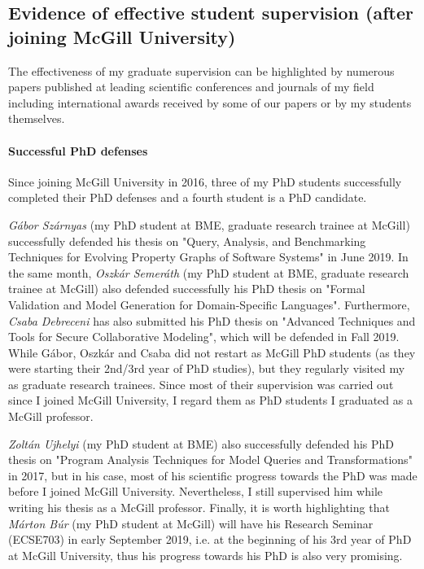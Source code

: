 \documentclass[a4paper,11pt]{report}
\begin{document}

\subsection{Evidence of effective student supervision (after joining McGill University)}

The effectiveness of my graduate supervision can be highlighted by numerous papers published at leading scientific 
conferences and journals of my field including international awards received by some of our papers or by my students 
themselves. 

\paragraph{Successful PhD defenses}
Since joining McGill University in 2016, three of my PhD students successfully completed their PhD defenses and a fourth student is a PhD candidate. 

\emph{Gábor Szárnyas} (my PhD student at BME, graduate research trainee at McGill) successfully defended his thesis on "Query, Analysis, and Benchmarking Techniques for Evolving Property Graphs of Software Systems" in June 2019. In the same month, \emph{Oszkár Semeráth} (my PhD student at BME, graduate research trainee at McGill) also defended successfully his PhD thesis on "Formal Validation and Model Generation for Domain-Specific Languages". Furthermore, \emph{Csaba Debreceni} has also submitted his PhD thesis on "Advanced Techniques and Tools for Secure Collaborative Modeling", which will be defended in Fall 2019. 
While Gábor, Oszkár and Csaba did not restart as McGill PhD students (as they were starting their 2nd/3rd year of PhD studies), but they regularly visited my as graduate research trainees. Since most of their supervision was carried out since I joined McGill University, I regard them as PhD students I graduated as a McGill professor. 

\emph{Zoltán Ujhelyi} (my PhD student at BME) also successfully defended his PhD thesis on "Program Analysis Techniques for Model Queries and Transformations" in 2017, but in his case, most of his scientific progress towards the PhD was made before I joined McGill University. Nevertheless, I still supervised him while writing his thesis as a McGill professor.  Finally, it is worth highlighting that \emph{Márton Búr} (my PhD student at McGill) will have his Research Seminar (ECSE703) in early September 2019, i.e. at the beginning of his 3rd year of PhD at McGill University, thus his progress towards his PhD is also very promising.
\end{document}
